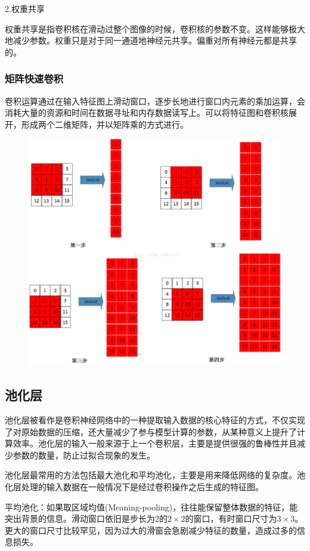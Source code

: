 \documentclass[openbib]{article}
\begin{document}
2.权重共享

权重共享是指卷积核在滑动过整个图像的时候，卷积核的参数不变。这样能够极大地减少参数。权重只是对于同一通道地神经元共享。偏重对所有神经元都是共享的。

\subsubsection{矩阵快速卷积}
卷积运算通过在输入特征图上滑动窗口，逐步长地进行窗口内元素的乘加运算，会消耗大量的资源和时间在数据寻址和内存数据读写上。可以将特征图和卷积核展开，形成两个二维矩阵，并以矩阵乘的方式进行。
\begin{figure}[htbp]
	\centering
	\includegraphics[scale=0.3]{im2col}
\end{figure}
\subsection{池化层}
池化层被看作是卷积神经网络中的一种提取输入数据的核心特征的方式，不仅实现了对原始数据的压缩，还大量减少了参与模型计算的参数，从某种意义上提升了计算效率。池化层的输入一般来源于上一个卷积层，主要是提供很强的鲁棒性并且减少参数的数量，防止过拟合现象的发生。

池化层最常用的方法包括最大池化和平均池化，主要是用来降低网络的复杂度。池化层处理的输入数据在一般情况下是经过卷积操作之后生成的特征图。

平均池化：如果取区域均值(Meaning-pooling)，往往能保留整体数据的特征，能突出背景的信息。滑动窗口依旧是步长为2的$2\times2$的窗口，有时窗口尺寸为$3\times 3$。更大的窗口尺寸比较罕见，因为过大的滑窗会急剧减少特征的数量，造成过多的信息损失。
\end{document}
